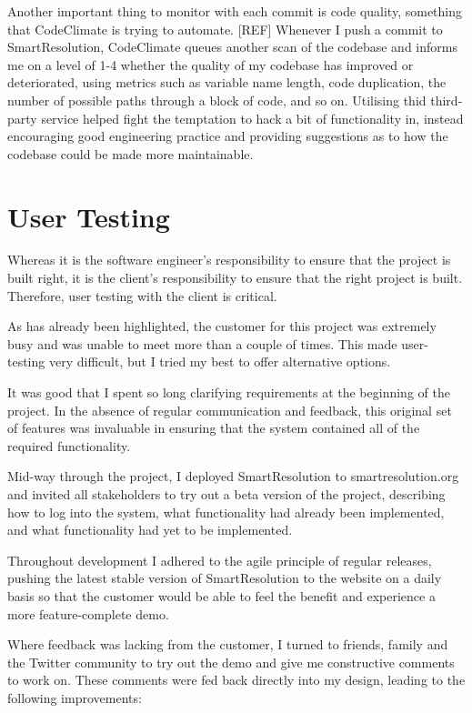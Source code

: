Another important thing to monitor with each commit is code quality, something that CodeClimate is trying to automate. [REF] Whenever I push a commit to SmartResolution, CodeClimate queues another scan of the codebase and informs me on a level of 1-4 whether the quality of my codebase has improved or deteriorated, using metrics such as variable name length, code duplication, the number of possible paths through a block of code, and so on. Utilising thid third-party service helped fight the temptation to hack a bit of functionality in, instead encouraging good engineering practice and providing suggestions as to how the codebase could be made more maintainable. %

\section{User Testing}

Whereas it is the software engineer's responsibility to ensure that the project is built right, it is the client's responsibility to ensure that the right project is built. Therefore, user testing with the client is critical.

As has already been highlighted, the customer for this project was extremely busy and was unable to meet more than a couple of times. This made user-testing very difficult, but I tried my best to offer alternative options.

It was good that I spent so long clarifying requirements at the beginning of the project. In the absence of regular communication and feedback, this original set of features was invaluable in ensuring that the system contained all of the required functionality.

Mid-way through the project, I deployed SmartResolution to smartresolution.org and invited all stakeholders to try out a beta version of the project, describing how to log into the system, what functionality had already been implemented, and what functionality had yet to be implemented.

Throughout development I adhered to the agile principle of regular releases, pushing the latest stable version of SmartResolution to the website on a daily basis so that the customer would be able to feel the benefit and experience a more feature-complete demo.

Where feedback was lacking from the customer, I turned to friends, family and the Twitter community to try out the demo and give me constructive comments to work on. These comments were fed back directly into my design, leading to the following improvements:

